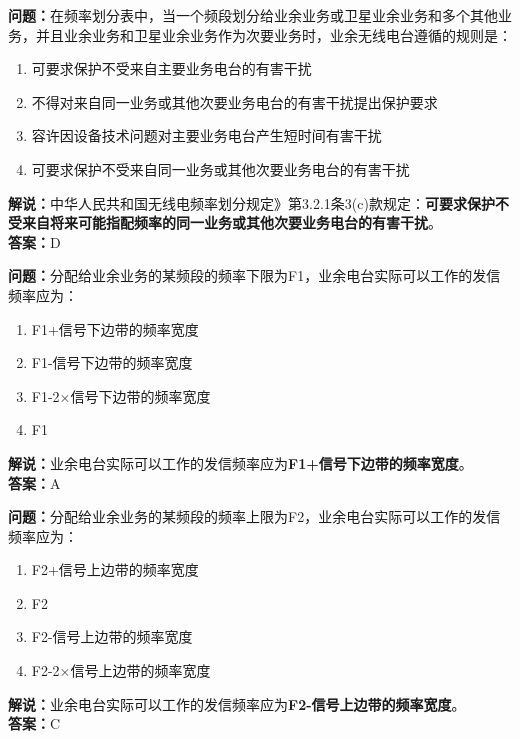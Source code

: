 \bigskip


\noindent\textbf{问题：}在频率划分表中，当一个频段划分给业余业务或卫星业余业务和多个其他业务，并且业余业务和卫星业余业务作为次要业务时，业余无线电台遵循的规则是：
\begin{enumerate}[label=\Alph*), leftmargin=3em]
\item 可要求保护不受来自主要业务电台的有害干扰
\item 不得对来自同一业务或其他次要业务电台的有害干扰提出保护要求
\item 容许因设备技术问题对主要业务电台产生短时间有害干扰
\item 可要求保护不受来自同一业务或其他次要业务电台的有害干扰
\end{enumerate}
\noindent\textbf{解说：}中华人民共和国无线电频率划分规定》第3.2.1条3(c)款规定：\textbf{可要求保护不受来自将来可能指配频率的同一业务或其他次要业务电台的有害干扰}。\\\textbf{答案：}D



\bigskip


\noindent\textbf{问题：}分配给业余业务的某频段的频率下限为F1，业余电台实际可以工作的发信频率应为：
\begin{enumerate}[label=\Alph*), leftmargin=3em]
\item F1+信号下边带的频率宽度
\item F1-信号下边带的频率宽度
\item F1-2×信号下边带的频率宽度
\item F1
\end{enumerate}
\noindent\textbf{解说：}业余电台实际可以工作的发信频率应为\textbf{F1+信号下边带的频率宽度}。\\\noindent\textbf{答案：}A





\bigskip


\noindent\textbf{问题：}分配给业余业务的某频段的频率上限为F2，业余电台实际可以工作的发信频率应为：
\begin{enumerate}[label=\Alph*), leftmargin=3em]
\item F2+信号上边带的频率宽度
\item F2
\item F2-信号上边带的频率宽度
\item F2-2×信号上边带的频率宽度
\end{enumerate}
\noindent\textbf{解说：}业余电台实际可以工作的发信频率应为\textbf{F2-信号上边带的频率宽度}。\\\noindent\textbf{答案：}C





